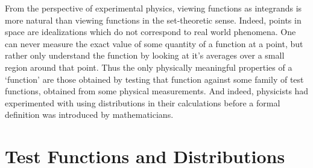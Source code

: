 \begin{remark}
  From the perspective of experimental physics, viewing functions as integrands is more natural than viewing functions in the set-theoretic sense. Indeed, points in space are idealizations which do not correspond to real world phenomena. One can never measure the exact value of some quantity of a function at a point, but rather only understand the function by looking at it's averages over a small region around that point. Thus the only physically meaningful properties of a `function' are those obtained by testing that function against some family of test functions, obtained from some physical measurements. And indeed, physicists had experimented with using distributions in their calculations before a formal definition was introduced by mathematicians.
\end{remark}

\section{Test Functions and Distributions}

